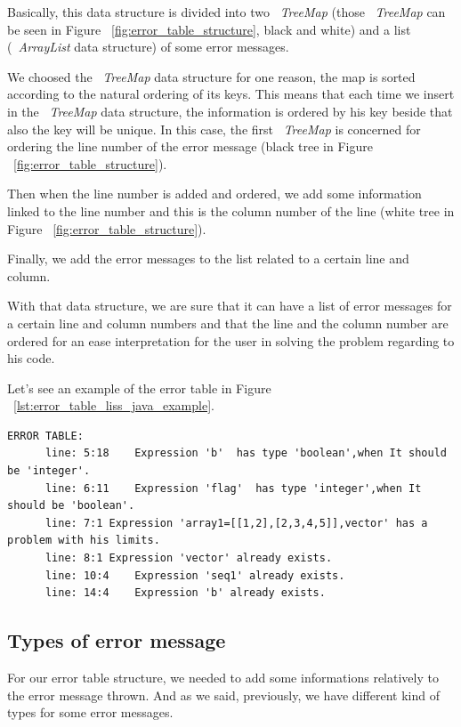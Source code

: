 \documentclass[
  oneside,
  11pt, a4paper,
  footinclude=true,
  headinclude=true,
  cleardoublepage=empty
]{scrbook}
\begin{document}
Basically, this data structure is divided into two ~\textit{TreeMap} (those ~\textit{TreeMap} can be seen in Figure ~\ref{fig:error_table_structure}, black and white) and a list (~\textit{ArrayList} data structure) of some error messages.

We choosed the ~\textit{TreeMap} data structure for one reason, the map is sorted according to the natural ordering of its keys.
This means that each time we insert in the ~\textit{TreeMap} data structure, the information is ordered by his key beside that also the key will be unique.
In this case, the first ~\textit{TreeMap} is concerned for ordering the line number of the error message (black tree in Figure ~\ref{fig:error_table_structure}).

Then when the line number is added and ordered, we add some information linked to the line number and this is the column number of the line (white tree in Figure ~\ref{fig:error_table_structure}).

Finally, we add the error messages to the list related to a certain line and column.

With that data structure, we are sure that it can have a list of error messages for a certain line and column numbers and that the line and the column number are ordered for an ease interpretation for the user in solving the problem regarding to his code.

Let's see an example of the error table in Figure ~\ref{lst:error_table_liss_java_example}.

\begin{lstlisting}[caption={Example of an error table},label={lst:error_table_liss_java_example}]
	ERROR TABLE:
	  line: 5:18	Expression 'b'  has type 'boolean',when It should be 'integer'.
	  line: 6:11	Expression 'flag'  has type 'integer',when It should be 'boolean'.
	  line: 7:1	Expression 'array1=[[1,2],[2,3,4,5]],vector' has a problem with his limits.
	  line: 8:1	Expression 'vector' already exists.
	  line: 10:4	Expression 'seq1' already exists.
	  line: 14:4	Expression 'b' already exists.
\end{lstlisting}

\subsection{Types of error message}

For our error table structure, we needed to add some informations relatively to the error message thrown.
And as we said, previously, we have different kind of types for some error messages.
\end{document}

